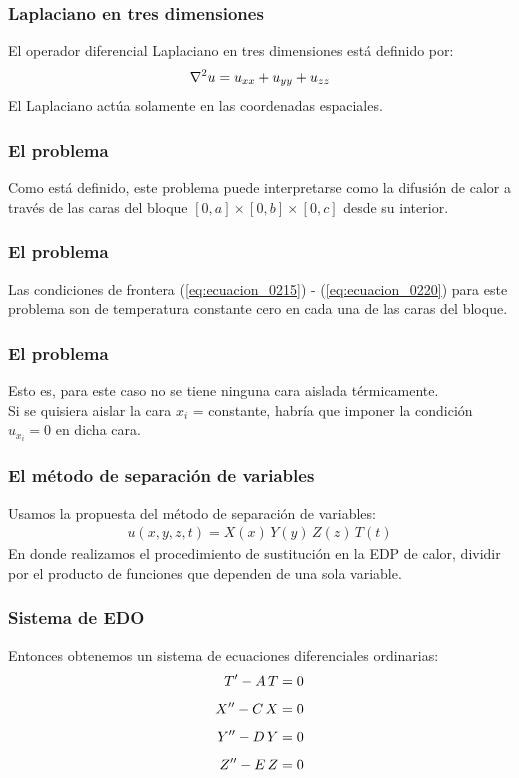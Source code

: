 \documentclass[12pt]{beamer}
\begin{document}
\begin{frame}
\frametitle{Laplaciano en tres dimensiones}
El operador diferencial Laplaciano en tres dimensiones está definido por:
\begin{align}
\laplacian{u} = u_{xx} +u_{yy} + u_{zz}
\end{align}
El Laplaciano actúa solamente en las coordenadas espaciales.
\end{frame}
\begin{frame}
\frametitle{El problema}
Como está definido, este problema puede interpretarse como la difusión de calor a través de las caras del bloque $[0, a] \times [0, b] \times [0,c]$ desde su interior.
\end{frame}
\begin{frame}
\frametitle{El problema}
Las condiciones de frontera (\ref{eq:ecuacion_0215}) - (\ref{eq:ecuacion_0220}) para este problema son de temperatura constante cero en cada una de las caras del bloque.
\end{frame}
\begin{frame}
\frametitle{El problema}
Esto es, para este caso no se tiene ninguna cara aislada térmicamente.
\\
\bigskip
Si se quisiera aislar la cara $x_{i}$ = constante, habría que imponer la condición $u_{x_{i}} = 0$ en dicha cara.
\end{frame}
\begin{frame}
\frametitle{El método de separación de variables}
Usamos la propuesta del método de separación de variables:
\begin{align}
u (x, y, z, t) = X (x) \, Y (y) \, Z (z) \, T(t)
\label{eq:ecuacion_02_223}
\end{align}
\pause
En donde realizamos el procedimiento de sustitución en la EDP de calor, dividir por el producto de funciones que dependen de una sola variable.
\end{frame}
\begin{frame}
\frametitle{Sistema de EDO}
Entonces obtenemos un sistema de ecuaciones diferenciales ordinarias:
\begin{align}
{T}^{\prime} - A \, T &= 0 \label{eq:ecuacion_02_224} \\[0.5em]
{X}^{\prime \prime} - C \, X &= 0 \label{eq:ecuacion_02_225} \\[0.5em]
{Y}^{\prime \prime} - D \, Y &= 0 \label{eq:ecuacion_02_226} \\[0.5em]
{Z}^{\prime \prime} - E \, Z &= 0 \label{eq:ecuacion_02_227} \end{align}
\end{frame}
\end{document}
